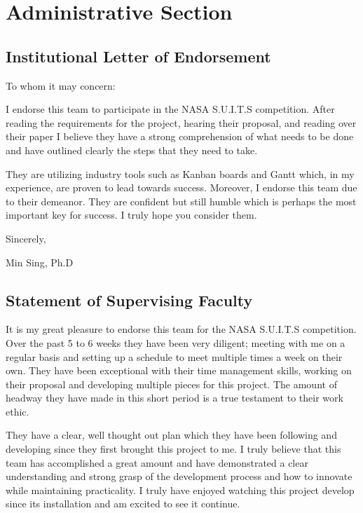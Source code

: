 \documentclass{article}
\let\Oldsection\section
\renewcommand{\section}{\FloatBarrier\Oldsection}
\let\Oldsubsection\subsection
\renewcommand{\subsection}{\FloatBarrier\Oldsubsection}
\begin{document}
\newpage

\section{Administrative Section}

\subsection{Institutional Letter of Endorsement}

To whom it may concern:

I endorse this team to participate in the NASA S.U.I.T.S competition. After reading the requirements for the project, hearing their proposal, and reading over their paper I believe they have a strong comprehension of what needs to be done and have outlined clearly the steps that they need to take.

They are utilizing industry tools such as Kanban boards and Gantt which, in my experience, are proven to lead towards success. Moreover, I endorse this team due to their demeanor. They are confident but still humble which is perhaps the most important key for success. I truly hope you consider them.

Sincerely,

Min Sing, Ph.D

\newpage

\subsection{Statement of Supervising Faculty}

It is my great pleasure to endorse this team for the NASA S.U.I.T.S competition. Over the past 5 to 6 weeks they have been very diligent; meeting with me on a regular basis and setting up a schedule to meet multiple times a week on their own. They have been exceptional with their time management skills, working on their proposal and developing multiple pieces for this project. The amount of headway they have made in this short period is a true testament to their work ethic.  

They have a clear, well thought out plan which they have been following and developing since they first brought this project to me. I truly believe that this team has accomplished a great amount and have demonstrated a clear understanding and strong grasp of the development process and how to innovate while maintaining practicality. I truly have enjoyed watching this project develop since its installation and am excited to see it continue.
\end{document}
